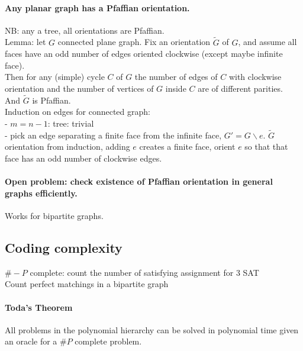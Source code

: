 \documentclass[12pt]{article}
\begin{document}
\paragraph{Any planar graph has a Pfaffian orientation.\\}
NB: any a tree, all orientations are Pfaffian.\\
Lemma: let $G$ connected plane graph. Fix an orientation $\tilde{G}$ of $G$, and assume all faces have an odd number of edges oriented clockwise (except maybe infinite face).\\
Then for any (simple) cycle $C$ of $G$ the number of edges of $C$ with clockwise orientation and the number of vertices of $G$ inside $C$ are of different parities.\\
And $\tilde{G}$ is Pfaffian.\\
Induction on edges for connected graph:\\
- $m=n-1$: tree: trivial\\
- pick an edge separating a finite face from the infinite face, $G' = G \backslash e$. $\tilde{G}$ orientation from induction, adding $e$ creates a finite face, orient $e$ so that that face has an odd number of clockwise edges.\\

\paragraph{Open problem: check existence of Pfaffian orientation in general graphs efficiently.\\}
Works for bipartite graphs.\\

\subsection{Coding complexity}

$\#-P$ complete: count the number of satisfying assignment for 3 SAT\\
Count perfect matchings in a bipartite graph\\

\paragraph{Toda's Theorem\\}
All problems in the polynomial hierarchy can be solved in polynomial time given an oracle for a $\#P$ complete problem.\\
\end{document}
